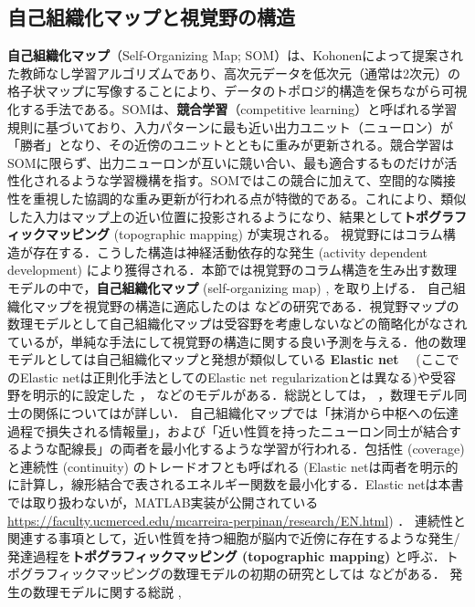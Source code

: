 \subsection{自己組織化マップと視覚野の構造}
\textbf{自己組織化マップ}（Self-Organizing Map; SOM）は、Kohonenによって提案された教師なし学習アルゴリズムであり、高次元データを低次元（通常は2次元）の格子状マップに写像することにより、データのトポロジ的構造を保ちながら可視化する手法である。SOMは、\textbf{競合学習}（competitive learning）と呼ばれる学習規則に基づいており、入力パターンに最も近い出力ユニット（ニューロン）が「勝者」となり、その近傍のユニットとともに重みが更新される。競合学習はSOMに限らず、出力ニューロンが互いに競い合い、最も適合するものだけが活性化されるような学習機構を指す。SOMではこの競合に加えて、空間的な隣接性を重視した協調的な重み更新が行われる点が特徴的である。これにより、類似した入力はマップ上の近い位置に投影されるようになり、結果として\textbf{トポグラフィックマッピング} (topographic mapping) が実現される。
視覚野にはコラム構造が存在する．こうした構造は神経活動依存的な発生  (activity dependent development) により獲得される．本節では視覚野のコラム構造を生み出す数理モデルの中で，\textbf{自己組織化マップ} (self-organizing map) \citep{Kohonen1982-mn}, \citep{Kohonen2013-yt}を取り上げる．
自己組織化マップを視覚野の構造に適応したのは\citep{Obermayer1990-gq} \citep{N_V_Swindale1998-ri}などの研究である．視覚野マップの数理モデルとして自己組織化マップは受容野を考慮しないなどの簡略化がなされているが，単純な手法にして視覚野の構造に関する良い予測を与える．他の数理モデルとしては自己組織化マップと発想が類似している \textbf{Elastic net}  \citep{Durbin1987-bp} \citep{Durbin1990-xx} \citep{Carreira-Perpinan2005-gy}　(ここでのElastic netは正則化手法としてのElastic net regularizationとは異なる)や受容野を明示的に設定した \citep{Tanaka2004-vz}， \citep{Ringach2007-oe}などのモデルがある．総説としては\citep{Das2005-mq}，\citep{Goodhill2007-va} ，数理モデル同士の関係については\citep{2002-nm}が詳しい．
自己組織化マップでは「抹消から中枢への伝達過程で損失される情報量」，および「近い性質を持ったニューロン同士が結合するような配線長」の両者を最小化するような学習が行われる．包括性 (coverage) と連続性 (continuity) のトレードオフとも呼ばれる \citep{Carreira-Perpinan2005-gy} (Elastic netは両者を明示的に計算し，線形結合で表されるエネルギー関数を最小化する．Elastic netは本書では取り扱わないが，MATLAB実装が公開されている
\url{https://faculty.ucmerced.edu/mcarreira-perpinan/research/EN.html}) ． 連続性と関連する事項として，近い性質を持つ細胞が脳内で近傍に存在するような発生/発達過程を\textbf{トポグラフィックマッピング (topographic mapping)} と呼ぶ．トポグラフィックマッピングの数理モデルの初期の研究としては\citep{Von_der_Malsburg1973-bz} \citep{Willshaw1976-zo} \citep{Takeuchi1979-mi}などがある．
発生の数理モデルに関する総説 \citep{Van_Ooyen2011-fz}, \citep{Goodhill2018-ho}
